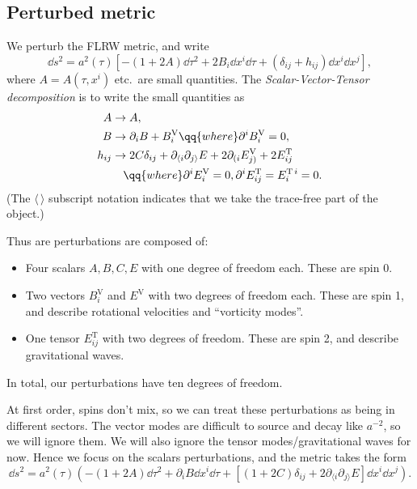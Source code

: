 \documentclass{jknotes}
\begin{document}
\subsection{Perturbed metric}
We perturb the FLRW metric, and write
\begin{equation}
    \dd{s}^2 = a^2(\tau)\left[-(1+2A)\dd{\tau}^2 + 2B_i\dd{x^i}\dd{\tau} + (\delta_{ij} + h_{ij})\dd{x^i}\dd{x^j}\right],
\end{equation}
where \(A=A(\tau,x^i)\) etc.\ are small quantities. The \emph{Scalar-Vector-Tensor decomposition} is to write the small quantities as
\begin{align}
    A &\to A, \\
    B &\to \partial_iB + B^{\mathrm{V}}_i \qq{where} \partial^iB_i^{\mathrm{V}}=0, \\
    h_{ij} &\to 2C\delta_{ij} + \partial_{\langle i}\partial_{j\rangle} E + 2\partial_{(i}E^{\mathrm{V}}_{j)}+2E^{\mathrm{T}}_{ij} \\
           & \quad \qq{where} \partial^iE_i^{\mathrm{V}} = 0, \partial^iE_{ij}^{\mathrm{T}}=E^{\mathrm{T}\,i}_i=0.
\end{align}
(The \(\langle\,\rangle\) subscript notation indicates that we take the trace-free part of the object.)

Thus are perturbations are composed of:
\begin{itemize}
    \item Four scalars \(A,B,C,E\) with one degree of freedom each. These are spin 0.
    \item Two vectors \(B^{\mathrm{V}}_i\) and \(E^{\mathrm{V}}\) with two degrees of freedom each. These are spin 1, and describe rotational velocities and ``vorticity modes''.
    \item One tensor \(E^{\mathrm{T}}_{ij}\) with two degrees of freedom. These are spin 2, and describe gravitational waves.
\end{itemize}
In total, our perturbations have ten degrees of freedom.

At first order, spins don't mix, so we can treat these perturbations as being in different sectors. The vector modes are difficult to source and decay like \(a^{-2}\), so we will ignore them. We will also ignore the tensor modes/gravitational waves for now. Hence we focus on the scalars perturbations, and the metric takes the form
\begin{equation}
    \dd{s}^2 = a^2(\tau)\left(-(1+2A)\dd{\tau}^2+\partial_iB\dd{x^i}\dd{\tau} + \left[(1+2C)\delta_{ij} + 2\partial_{\langle i}\partial_{j\rangle}E\right]\dd{x^i}\dd{x^j}\right).
\end{equation}
\end{document}
